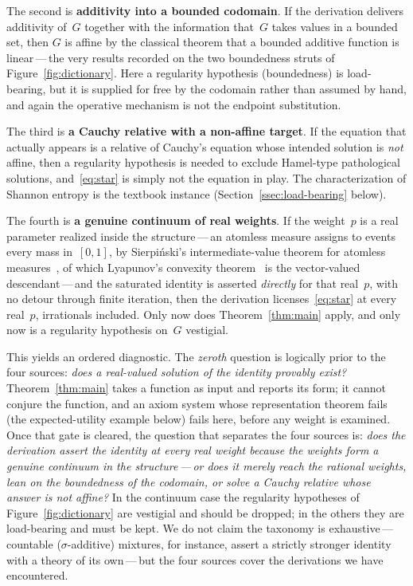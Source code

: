 \documentclass{article}
\theoremstyle{plain}
\theoremstyle{definition}
\begin{document}
The second is \textbf{additivity into a bounded codomain}. If the
derivation delivers additivity of~$G$ together with the information
that~$G$ takes values in a bounded set, then $G$ is affine by the
classical theorem that a bounded additive function is linear\,---\,the
very results recorded on the two boundedness struts of
Figure~\ref{fig:dictionary}. Here a regularity hypothesis (boundedness)
is load-bearing, but it is supplied for free by the codomain rather
than assumed by hand, and again the operative mechanism is not the
endpoint substitution.

The third is \textbf{a Cauchy relative with a non-affine target}. If
the equation that actually appears is a relative of Cauchy's equation
whose intended solution is \emph{not} affine, then a regularity
hypothesis is needed to exclude Hamel-type pathological solutions,
and~\eqref{eq:star} is simply not the equation in play. The
characterization of Shannon entropy is the textbook instance
(Section~\ref{ssec:load-bearing} below).

The fourth is \textbf{a genuine continuum of real weights}. If the
weight~$p$ is a real parameter realized inside the
structure\,---\,an atomless measure assigns to events every mass
in~$[0,1]$, by Sierpi\'nski's intermediate-value theorem for atomless
measures~\cite{Sierpinski1922}, of which Lyapunov's convexity
theorem~\cite{Lyapunov1940} is the vector-valued
descendant\,---\,and the saturated
identity is asserted \emph{directly} for that real~$p$, with no
detour through finite iteration, then the derivation
licenses~\eqref{eq:star} at every real~$p$, irrationals included.
Only now does Theorem~\ref{thm:main} apply, and only now is a
regularity hypothesis on~$G$ vestigial.

This yields an ordered diagnostic. The \emph{zeroth} question is
logically prior to the four sources: \emph{does a real-valued solution
of the identity provably exist?} Theorem~\ref{thm:main} takes a
function as input and reports its form; it cannot conjure the
function, and an axiom system whose representation theorem fails (the
expected-utility example below) fails here, before any weight is
examined. Once that gate is cleared, the question that separates the
four sources is: \emph{does the derivation assert the identity at
every real weight because the weights form a genuine continuum in the
structure\,---\,or does it merely reach the rational weights, lean on
the boundedness of the codomain, or solve a Cauchy relative whose
answer is not affine?} In the continuum case the regularity hypotheses
of Figure~\ref{fig:dictionary} are vestigial and should be dropped; in
the others they are load-bearing and must be kept. We do not claim the
taxonomy is exhaustive\,---\,countable ($\sigma$-additive) mixtures,
for instance, assert a strictly stronger identity with a theory of its
own\,---\,but the four sources cover the derivations we have
encountered.
\end{document}
